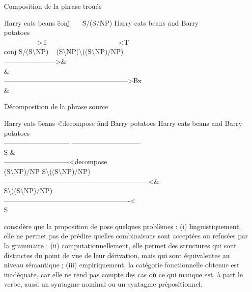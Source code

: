 \ea \label{ch2:ex241}
Composition de la phrase trouée\\
\begin{tabbing}
Harry eats beans \= conj~~~ \= S/(S/NP) \kill
Harry eats beans \> and \> Barry~~~~~~~~~~~~ potatoes\\
\> ------ \> -------->T~~ ---------------------------<T\\
\> conj \> S/(S{\textbackslash}NP) ~ (S{\textbackslash}NP){\textbackslash}((S{\textbackslash}NP)/NP)\\            
\> ----------------------->\&\\
\>   [S/(S{\textbackslash}NP)]\&\\
\>  ------------------------------------------------------>Bx\\
\> \& 
\end{tabbing}

\z 

\ea \label{ch2:ex242}
Décomposition de la phrase source\\ 
\begin{tabbing}
Harry eats  \= beans \= <decompose  \= and \= Barry potatoes \kill
Harry eats  \> beans \>             \>and Barry potatoes\\
-----------------------------\>\>   \>------------------------------\\
            \> S      \>            \&\\ 
-----------------------------<decompose\\
(S{\textbackslash}NP)/NP S{\textbackslash}((S{\textbackslash}NP)/NP)\\
            \>    ---------------------------------------------------------------<\&\\ 
            \> \hspace*{15mm}S{\textbackslash}((S{\textbackslash}NP)/NP)\\
-------------------------------------------------------<\\
            \> \> S
\end{tabbing}
\z 

\citet{Gardent1991} considère que la proposition de \citet{Steedman1990} pose quel\-ques problèmes : (i) linguistiquement, elle ne permet pas de prédire quelles combinaisons sont acceptées ou refusées par la grammaire ; (ii) computationnellement, elle permet des structures qui sont distinctes du point de vue de leur dérivation, mais qui sont équivalentes au niveau sémantique ; (iii) empiriquement, la catégorie fonctionnelle obtenue est inadéquate, car elle ne rend pas compte des cas où ce qui manque est, à part le verbe, aussi un syntagme nominal ou un syntagme prépositionnel. 

